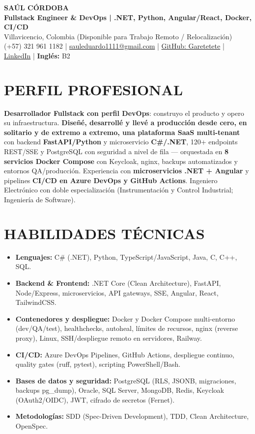 \documentclass[letterpaper,10pt]{article}
\begin{document}
\begin{center}
    {\Huge \bfseries SAÚL CÓRDOBA} \\[3pt]
    {\Large \textbf{Fullstack Engineer \& DevOps | .NET, Python, Angular/React, Docker, CI/CD}} \\[2pt]
    Villavicencio, Colombia (Disponible para Trabajo Remoto / Relocalización) \\
    (+57) 321 961 1182 | \href{mailto:sauleduardo1111@gmail.com}{sauleduardo1111@gmail.com} | \href{https://github.com/Garetetete}{GitHub: Garetetete} | \href{https://www.linkedin.com/in/saul-cordoba-a2997427b}{LinkedIn} | \textbf{Inglés:} B2
\end{center}

\section{PERFIL PROFESIONAL}
\textbf{Desarrollador Fullstack con perfil DevOps}: construyo el producto y opero su infraestructura. \textbf{Diseñé, desarrollé y llevé a producción desde cero, en solitario y de extremo a extremo, una plataforma SaaS multi-tenant} con backend \textbf{FastAPI/Python} y microservicio \textbf{C\#/.NET}, 120+ endpoints REST/SSE y PostgreSQL con seguridad a nivel de fila — orquestada en \textbf{8 servicios Docker Compose} con Keycloak, nginx, backups automatizados y entornos QA/producción. Experiencia con \textbf{microservicios .NET + Angular} y pipelines \textbf{CI/CD en Azure DevOps y GitHub Actions}. Ingeniero Electrónico con doble especialización (Instrumentación y Control Industrial; Ingeniería de Software).

\section{HABILIDADES TÉCNICAS}
\begin{itemize}
    \item \textbf{Lenguajes:} C\# (.NET), Python, TypeScript/JavaScript, Java, C, C++, SQL.
    \item \textbf{Backend \& Frontend:} .NET Core (Clean Architecture), FastAPI, Node/Express, microservicios, API gateways, SSE, Angular, React, TailwindCSS.
    \item \textbf{Contenedores y despliegue:} Docker y Docker Compose multi-entorno (dev/QA/test), healthchecks, autoheal, límites de recursos, nginx (reverse proxy), Linux, SSH/despliegue remoto en servidores, Railway.
    \item \textbf{CI/CD:} Azure DevOps Pipelines, GitHub Actions, despliegue continuo, quality gates (ruff, pytest), scripting PowerShell/Bash.
    \item \textbf{Bases de datos y seguridad:} PostgreSQL (RLS, JSONB, migraciones, backups pg\_dump), Oracle, SQL Server, MongoDB, Redis, Keycloak (OAuth2/OIDC), JWT, cifrado de secretos (Fernet).
    \item \textbf{Metodologías:} SDD (Spec-Driven Development), TDD, Clean Architecture, OpenSpec.
\end{itemize}
\end{document}
